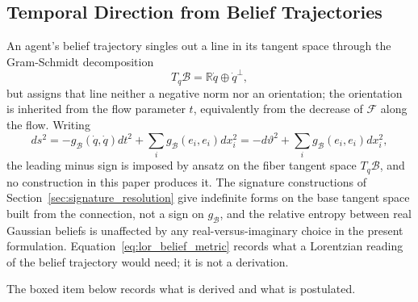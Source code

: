 \documentclass[11pt]{article}
\begin{document}
\subsection{Temporal Direction from Belief Trajectories}

An agent's belief trajectory singles out a line in its tangent space through the Gram-Schmidt decomposition
\begin{equation}
T_q\mathcal{B} = \mathbb{R}\dot{q} \oplus \dot{q}^\perp,
\label{eq:tangent_decomp}
\end{equation}
but assigns that line neither a negative norm nor an orientation; the orientation is inherited from the flow parameter $t$, equivalently from the decrease of $\mathcal{F}$ along the flow. Writing
\begin{equation}
ds^2 = -g_{\mathcal{B}}(\dot{q}, \dot{q}) dt^2 + \sum_i g_{\mathcal{B}}(e_i, e_i) dx_i^2 = -d\vartheta^2 + \sum_i g_{\mathcal{B}}(e_i, e_i) dx_i^2,
\label{eq:lor_belief_metric}
\end{equation}
the leading minus sign is imposed by ansatz on the fiber tangent space $T_q\mathcal{B}$, and no construction in this paper produces it. The signature constructions of Section~\ref{sec:signature_resolution} give indefinite forms on the base tangent space built from the connection, not a sign on $g_{\mathcal{B}}$, and the relative entropy between real Gaussian beliefs is unaffected by any real-versus-imaginary choice in the present formulation. Equation~\eqref{eq:lor_belief_metric} records what a Lorentzian reading of the belief trajectory would need; it is not a derivation.

The boxed item below records what is derived and what is postulated.
\end{document}
